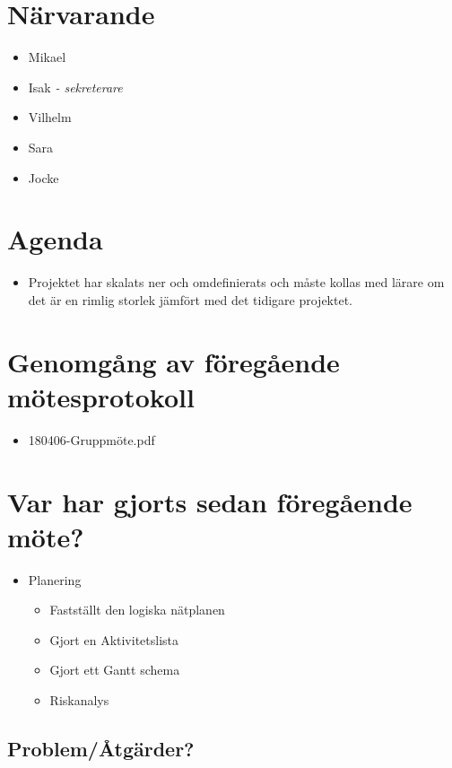 
\section*{Närvarande}
\begin{itemize}[noitemsep]
    \item Mikael
    \item Isak \textit{- sekreterare}
    \item Vilhelm
    \item Sara
    \item Jocke
\end{itemize}

\section*{Agenda}
\begin{itemize}
	\item Projektet har skalats ner och omdefinierats och måste kollas med lärare om det är en rimlig storlek jämfört med det tidigare projektet.
\end{itemize}

\section*{Genomgång av föregående mötesprotokoll}
\begin{itemize}[noitemsep]
    \item 180406-Gruppmöte.pdf
\end{itemize}

\section*{Var har gjorts sedan föregående möte?}
\begin{itemize}[noitemsep]
    \item Planering
    \begin{itemize}[noitemsep]
        \item Fastställt den logiska nätplanen
        \item Gjort en Aktivitetslista
        \item Gjort ett Gantt schema
        \item Riskanalys
    \end{itemize}
\end{itemize}

\subsection*{Problem/Åtgärder?}

